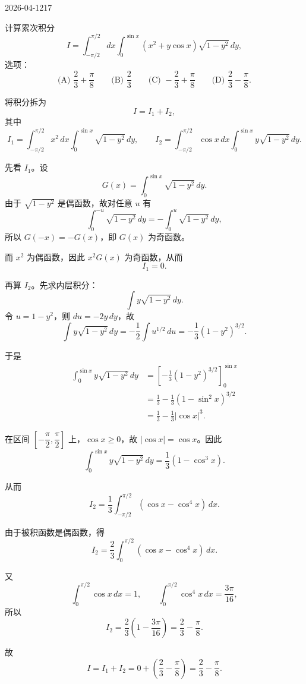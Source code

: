 \begin{mistake}{2026-04-12}{17}

\begin{problemcontent}
计算累次积分
\[
I=\int_{-\pi/2}^{\pi/2} dx\int_0^{\sin x} (x^2+y\cos x)\sqrt{1-y^2}\,dy,
\]
选项：
\[
\text{(A) } \frac{2}{3}+\frac{\pi}{8}
\qquad
\text{(B) } \frac{2}{3}
\qquad
\text{(C) } -\frac{2}{3}+\frac{\pi}{8}
\qquad
\text{(D) } \frac{2}{3}-\frac{\pi}{8}.
\]

\end{problemcontent}

\begin{solutioncontent}
将积分拆为
\[
I=I_1+I_2,
\]
其中
\[
I_1=\int_{-\pi/2}^{\pi/2} x^2\,dx\int_0^{\sin x} \sqrt{1-y^2}\,dy,
\qquad
I_2=\int_{-\pi/2}^{\pi/2} \cos x\,dx\int_0^{\sin x} y\sqrt{1-y^2}\,dy.
\]

先看 \(I_1\)。设
\[
G(x)=\int_0^{\sin x} \sqrt{1-y^2}\,dy.
\]
由于 \(\sqrt{1-y^2}\) 是偶函数，故对任意 \(u\) 有
\[
\int_0^{-u} \sqrt{1-y^2}\,dy=-\int_0^u \sqrt{1-y^2}\,dy,
\]
所以 \(G(-x)=-G(x)\)，即 \(G(x)\) 为奇函数。

而 \(x^2\) 为偶函数，因此 \(x^2G(x)\) 为奇函数，从而
\[
I_1=0.
\]

再算 \(I_2\)。先求内层积分：
\[
\int y\sqrt{1-y^2}\,dy.
\]
令 \(u=1-y^2\)，则 \(du=-2y\,dy\)，故
\[
\int y\sqrt{1-y^2}\,dy=-\frac12\int u^{1/2}\,du=-\frac13(1-y^2)^{3/2}.
\]

于是
\[
\begin{aligned}
\int_0^{\sin x} y\sqrt{1-y^2}\,dy
&=\left[-\frac13(1-y^2)^{3/2}\right]_0^{\sin x}\\
&=\frac13-\frac13(1-\sin^2 x)^{3/2}\\
&=\frac13-\frac13|\cos x|^3.
\end{aligned}
\]

在区间 \(\left[-\dfrac{\pi}{2},\dfrac{\pi}{2}\right]\) 上，\(\cos x\ge 0\)，故 \(|\cos x|=\cos x\)。因此
\[
\int_0^{\sin x} y\sqrt{1-y^2}\,dy=\frac13(1-\cos^3 x).
\]

从而
\[
I_2=\frac13\int_{-\pi/2}^{\pi/2}(\cos x-\cos^4 x)\,dx.
\]

由于被积函数是偶函数，得
\[
I_2=\frac23\int_0^{\pi/2}(\cos x-\cos^4 x)\,dx.
\]

又
\[
\int_0^{\pi/2}\cos x\,dx=1,
\qquad
\int_0^{\pi/2}\cos^4 x\,dx=\frac{3\pi}{16},
\]
所以
\[
I_2=\frac23\left(1-\frac{3\pi}{16}\right)=\frac23-\frac{\pi}{8}.
\]

故
\[
I=I_1+I_2=0+\left(\frac23-\frac{\pi}{8}\right)=\frac23-\frac{\pi}{8}.
\]


\end{solutioncontent}
\end{mistake}
